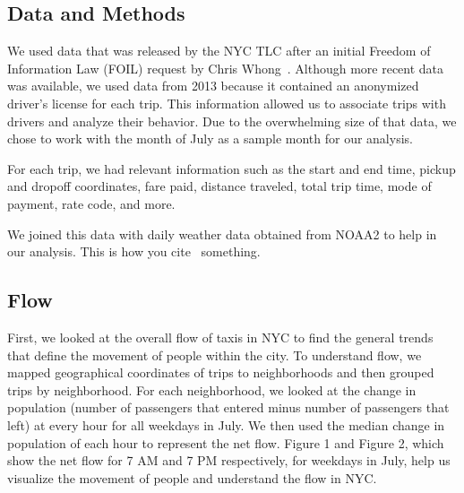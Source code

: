 \documentclass[]{article}
\begin{document}
\begin{multicols}{2}
\section{Data and Methods}
We used data that was released by the NYC TLC after an initial Freedom of Information Law (FOIL) request by Chris Whong~\cite{Whong:2014}. Although more recent data was available, we used data from 2013 because it contained an anonymized driver’s license for each trip. This information allowed us to associate trips with drivers and analyze their behavior. Due to the overwhelming size of that data, we chose to work with the month of July as a sample month for our analysis.

For each trip, we had relevant information such as the start and end time, pickup and dropoff coordinates, fare paid, distance traveled, total trip time, mode of payment, rate code, and more.

We joined this data with daily weather data obtained from NOAA2 to help in our analysis. 
This is how you cite~\cite{Farber:2014} something.

\subsection{Flow}
First, we looked at the overall flow of taxis in NYC to find the general trends that define the movement of people within the city. To understand flow, we mapped geographical coordinates of trips to neighborhoods and then grouped trips by neighborhood. For each neighborhood, we looked at the change in population (number of passengers that entered minus number of passengers that left) at every hour for all weekdays in July. We then used the median change in population of each hour to represent the net flow. Figure 1 and Figure 2, which show the net flow for 7 AM and 7 PM respectively, for weekdays in July, help us visualize the movement of people and understand the flow in NYC.
\end{multicols}
\end{document}
